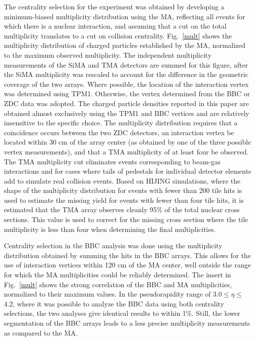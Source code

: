 \documentclass[singlespacing]{elsart}
\begin{document}
The centrality selection for the experiment was obtained by developing
a minimum-biased multiplicity distribution using the MA, 
reflecting all events for which 
there is a nuclear interaction, and assuming 
that a cut on the total multiplicity translates to a cut 
on collision centrality.    
Fig.~\ref{mult} shows the 
multiplicity distribution of charged particles 
established by the MA, normalized to the maximum observed multiplicity. 
The independent multiplicity measurements of the
SiMA and TMA detectors are summed for this figure, after
the SiMA multiplicity was rescaled to account for the difference in
the geometric coverage of the two arrays.  Where possible,
the location of the 
interaction vertex was determined using TPM1.
Otherwise, the vertex determined from the BBC or ZDC data was adopted. The charged 
particle densities reported in this paper are obtained almost exclusively using the
TPM1 and BBC vertices and are relatively insensitive to the specific choice.  
The multiplicity distribution requires that
a coincidence occurs between the two ZDC detectors, an interaction vertex
be located within 30 cm of the array center (as obtained by one of the three
possible vertex measurements), and that a TMA multiplicity of at least four
be observed.  The TMA
multiplicity cut eliminates events corresponding to 
beam-gas interactions and for cases where tails of pedestals for individual
detector elements add to simulate real collision events. 
Based on HIJING simulations, where the shape of the multiplicity distribution
for events with fewer than 200 tile hits is used to estimate the 
missing yield for events with fewer than four tile hits,  
it is estimated that the TMA array
observes cleanly
95\% of the total nuclear cross sections. This value is used to correct for 
the missing cross section where the tile multiplicity is less than
four when determining the final multiplicities.    

Centrality selection in the BBC analysis was done 
using the multiplicity distribution
obtained by summing the hits in the BBC arrays.  This allows for the use of 
interaction vertices within 120 cm of the MA center, well outside the
range for which the MA multiplicities could be reliably determined. The
insert in Fig.~\ref{mult} shows the strong correlation of the
BBC and MA multiplicities, normalized to their maximum values. 
In the pseudorapidity range of 3.0$\le\eta\le$4.2,
where it was possible to analyze the BBC data using both
centrality selections, the two analyses give identical results
to within 1\%.  Still, the lower segmentation of the BBC arrays leads to
a less precise multiplicity measurements as compared to the MA.
\end{document}
